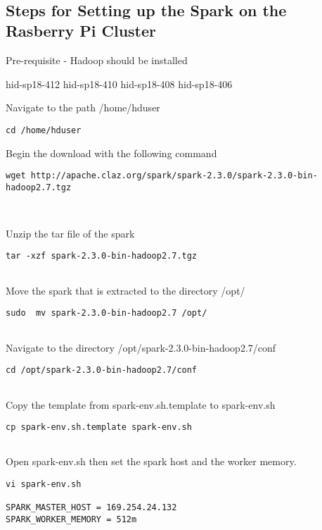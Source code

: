 \MDNAME\

\subsection{Steps for Setting up the Spark on the Rasberry Pi Cluster}

Pre-requisite - Hadoop should be installed

hid-sp18-412 hid-sp18-410 hid-sp18-408 hid-sp18-406

Navigate to the path /home/hduser

\begin{lstlisting}
cd /home/hduser 
\end{lstlisting}

Begin the download with the following command

\begin{lstlisting}
wget http://apache.claz.org/spark/spark-2.3.0/spark-2.3.0-bin-hadoop2.7.tgz
   
   
\end{lstlisting}

Unzip the tar file of the spark

\begin{lstlisting}
tar -xzf spark-2.3.0-bin-hadoop2.7.tgz
   
\end{lstlisting}

Move the spark that is extracted to the directory /opt/

\begin{lstlisting}
sudo  mv spark-2.3.0-bin-hadoop2.7 /opt/
   
\end{lstlisting}

Navigate to the directory /opt/spark-2.3.0-bin-hadoop2.7/conf

\begin{lstlisting}
cd /opt/spark-2.3.0-bin-hadoop2.7/conf
   
\end{lstlisting}

Copy the template from spark-env.sh.template to spark-env.sh

\begin{lstlisting}
cp spark-env.sh.template spark-env.sh
    
\end{lstlisting}

Open spark-env.sh then set the spark host and the worker memory.

\begin{lstlisting}
vi spark-env.sh

SPARK_MASTER_HOST = 169.254.24.132
SPARK_WORKER_MEMORY = 512m
\end{lstlisting}

